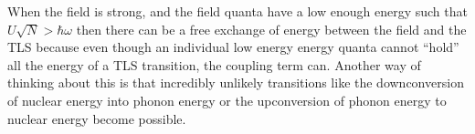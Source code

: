 \documentclass[
]{article}
\renewcommand{\[}{\begin{equation}}
\renewcommand{\]}{\end{equation}}
\begin{document}
When the field is strong, and the field quanta have a low enough energy
such that \(U\sqrt{N}>\hbar\omega\) then there can be a free exchange of
energy between the field and the TLS because even though an individual
low energy energy quanta cannot ``hold'' all the energy of a TLS
transition, the coupling term can. Another way of thinking about this is
that incredibly unlikely transitions like the downconversion of nuclear
energy into phonon energy or the upconversion of phonon energy to
nuclear energy become possible.

\printbibliography
\end{document}
